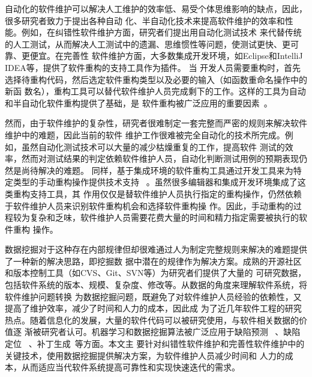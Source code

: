 自动化的软件维护可以解决人工维护的效率低、易受个体思维影响的缺点，因此，很多研究者致力于提出各种自动
化、半自动化技术来提高软件维护的效率和性能。例如，在纠错性软件维护方面，研究者们提出用自动化测试技术
来代替传统的人工测试，从而解决人工测试中的遗漏、思维惯性等问题，使测试更快、更可靠、更便宜。在完善性
软件维护方面，大多数集成开发环境，如Eclipse和IntelliJ IDEA等，提供了软件重构的支持工具作为插件。 当
开发人员需要重构时，首先选择待重构代码，然后选定软件重构类型以及必要的输入（如函数重命名操作中的新函
数名），重构工具可以替代软件维护人员完成剩下的工作。这样的工具为自动和半自动化软件重构提供了基础，是
软件重构被广泛应用的重要因素~\cite{griswold1993automated,tip2003refactoring,mens2005formalizing}。

然而，由于软件维护的复杂性，研究者很难制定一套完整而严密的规则来解决软件维护中的难题，因此当前的软件
维护工作很难被完全自动化的技术所完成。例如，虽然自动化测试技术可以大量的减少枯燥重复的工作，提高软件
测试的效率，然而对测试结果的判定依赖软件维护人员，自动化判断测试用例的预期表现仍然是尚待解决的难题。
同样，基于集成环境的软件重构工具通过开发工具来为特定类型的手动重构操作提供技术支持
~\cite{fowler1999refactoring, murphy2012we}。虽然很多编辑器和集成开发环境集成了这类重构支持工具，其
作用仅仅是替软件维护人员执行指定的重构操作，仍然依赖于软件维护人员来识别软件重构机会和选择软件重构操
作。因此，手动重构的过程较为复杂和乏味，软件维护人员需要花费大量的时间和精力指定需要被执行的软件重构
操作。

数据挖掘对于这种存在内部规律但却很难通过人为制定完整规则来解决的难题提供了一种新的解决思路，即挖掘数
据中潜在的规律作为解决方案。成熟的开源社区和版本控制工具（如CVS、Git、SVN等）为研究者们提供了大量的
可研究数据，包括软件系统的版本、规模、复杂度、修改等。从数据的角度来理解软件系统，将软件维护问题转换
为数据挖掘问题，既避免了对软件维护人员经验的依赖性，又提高了维护效率，减少了时间和人力的成本，因此成
为了近几年软件工程的研究热点。随着信息化的发展，大量的软件代码可以被研究使用，与软件相关数据的价值逐
渐被研究者认可。机器学习和数据挖掘算法被广泛应用于缺陷预测
~\cite{menzies2007data,drown2009evolutionary,khoshgoftaar2010attribute}、缺陷定位
~\cite{malcov2013,nnfault2013}、补丁生成~\cite{martinez2015mining, long2016automatic}等方面。本文主
要针对纠错性软件维护和完善性软件维护中的关键技术，使用数据挖掘提供解决方案，为软件维护人员减少时间和
人力的成本，从而适应当代软件系统提高可靠性和实现快速迭代的需求。

\iffalse
在程序修复方面，Martinez等人~\cite{martinez2015mining}通过挖掘软件仓库中的修复数据，为抽象语法树的修
改和错误修复之间的关系建模，预测修复错误的概率。Long~\cite{long2016automatic}等提出通过挖掘成功修复
错误的补丁，为每个成功的补丁提取了面向修改和数值的特征，前者表示程序修改和周围代码的关系，后者表示修
改前后变量数值的改变；最后通过最大似然来预测补丁可能能够成功修复错误的概率。
\fi


